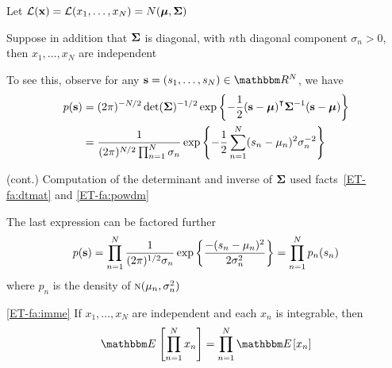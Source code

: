 \begin{frame}

    \vspace{2em}
    \Eg 
    
    Let $\mathcal L({\mathbf x}) = \mathcal L(x_1, \ldots, x_N) = N({\boldsymbol \mu}, {\boldsymbol \Sigma})$ 
    
    Suppose in
    addition that ${\boldsymbol \Sigma}$ is diagonal, with $n$th diagonal component
    $\sigma_n > 0$, then $x_1, \ldots, x_N$ are independent
    
    To see this, observe for any
    $\bolds = (s_1, \ldots, s_N) \in \RR^N$, we have
    \begin{align*}
        p(\bolds) 
        & = (2 \pi)^{-N/2} \determinant (\boldSigma)^{-1/2} 
        \exp \left\{ 
            - \frac{1}{2} (\bolds - \boldmu)^\T \boldSigma^{-1} (\bolds - \boldmu) 
        \right\}
        \\
        & = \frac{1}{(2 \pi)^{N/2} \prod_{n=1}^N \sigma_n}
        \exp \left\{ 
            - \frac{1}{2} \sum_{n=1}^N (s_n - \mu_n)^2 \sigma_n^{-2}
        \right\}
    \end{align*}
    
\end{frame}

\begin{frame}

    \vspace{2em}
    \Eg (cont.)
    Computation of the determinant and inverse of ${\boldsymbol \Sigma}$ used 
    facts~\ref{ET-fa:dtmat} and \ref{ET-fa:powdm}
    
    The last expression can be factored further
    \begin{equation*}
        p({\mathbf s}) 
        =
        \prod_{n=1}^N \frac{1}{(2 \pi)^{1/2} \sigma_n}
            \exp \left\{ 
                \frac{-(s_n - \mu_n)^2}{2 \sigma_n^2}
            \right\}
         =
        \prod_{n=1}^N p_n(s_n)
    \end{equation*}
    where $p_n$ is the density of $\textrm{\sc n}(\mu_n, \sigma^2_n)$

\end{frame}

\begin{frame}

    \vspace{2em}
    \Fact\eqref{ET-fa:imme}
   If $x_1, \ldots, x_N$ are independent and each $x_n$ is integrable, then
   \begin{equation*}
       \EE \left[ \prod_{n=1}^N x_n \right]
       = \prod_{n=1}^N \EE[ x_n ]
   \end{equation*}
\end{frame}

